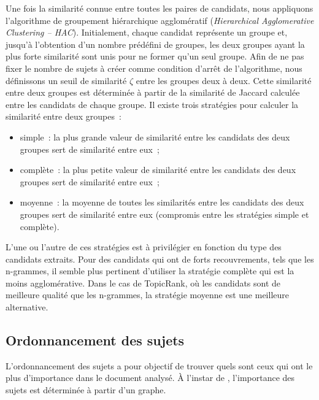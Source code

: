     Une fois la similarité connue entre toutes les paires de candidats, nous
    appliquons l'algorithme de groupement hiérarchique agglomératif
    (\textit{Hierarchical Agglomerative Clustering -- HAC}). Initialement,
    chaque candidat représente un groupe et, jusqu'à l'obtention d'un nombre
    prédéfini de groupes, les deux groupes ayant la plus forte similarité sont
    unis pour ne former qu'un seul groupe. Afin de ne pas fixer le nombre de
    sujets à créer comme condition d'arrêt de l'algorithme, nous définissons un
    seuil de similarité $\zeta$ entre les groupes deux à deux. Cette similarité
    entre deux groupes est déterminée à partir de la similarité de Jaccard
    calculée entre les candidats de chaque groupe. Il existe trois stratégies
    pour calculer la similarité entre deux groupes~:
    \begin{itemize}
      \item{simple~: la plus grande valeur de similarité entre les candidats
            des deux groupes sert de similarité entre eux~;}
      \item{complète~: la plus petite valeur de similarité entre les candidats
            des deux groupes sert de similarité entre eux~;}
      \item{moyenne~: la moyenne de toutes les similarités entre les
            candidats des deux groupes sert de similarité entre eux (compromis
            entre les stratégies simple et complète).}
    \end{itemize}
    L'une ou l'autre de ces stratégies est à privilégier en fonction du type des
    candidats extraits. Pour des candidats qui ont de forts recouvrements, tels
    que les n-grammes, il semble plus pertinent d'utiliser la
    stratégie complète qui est la moins agglomérative. Dans le cas de TopicRank,
    où les candidats sont de meilleure qualité que les n-grammes, la stratégie
    moyenne est une meilleure alternative.

  \subsection{Ordonnancement des sujets}
  \label{subsec:ordonnancement_des_sujets}
    L'ordonnancement des sujets a pour objectif de trouver quels sont ceux qui
    ont le plus d'importance dans le document analysé. À l'instar de
    , l'importance des sujets est déterminée à
    partir d'un graphe.

